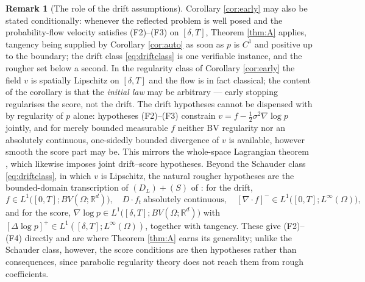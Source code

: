 \documentclass[11pt]{amsart}
\theoremstyle{definition}
\newtheorem{remark}[theorem]{Remark}
\newcommand{\dive}{\nabla\!\cdot}
\newcommand{\R}{\mathbb{R}}
\begin{document}
\begin{remark}[The role of the drift assumptions]
Corollary \ref{cor:early} may also be stated conditionally: whenever the
reflected problem is well posed and the probability-flow velocity
satisfies \textup{(F2)--(F3)} on $[\delta,T]$, Theorem \ref{thm:A}
applies, tangency being supplied by Corollary \ref{cor:auto} as soon
as $p$ is $C^1$ and positive up to the boundary; the drift class
\eqref{eq:driftclass} is one verifiable instance, and the rougher
set below a second. In the regularity class of Corollary
\ref{cor:early} the field $v$ is
spatially Lipschitz on $[\delta,T]$ and the flow is in fact
classical; the content of the corollary is that the \emph{initial
law} may be arbitrary --- early stopping regularises the score, not
the drift. The drift hypotheses cannot be dispensed with by
regularity of $p$ alone: hypotheses \textup{(F2)--(F3)} constrain
$v=f-\tfrac12\sigma^2\nabla\log p$ jointly, and for merely bounded
measurable $f$ neither BV regularity nor an absolutely continuous,
one-sidedly bounded divergence of $v$ is available, however smooth
the score part may be. This mirrors the whole-space Lagrangian
theorem \cite[Theorem~4.5]{pfode}, which likewise imposes joint
drift--score hypotheses. Beyond the Schauder class
\eqref{eq:driftclass}, in which $v$ is Lipschitz, the natural
rougher hypotheses are the bounded-domain transcription of
$(D_L)+(S)$ of \cite{pfode}: for the drift,
\[
f\in L^1\big([0,T];BV(\Omega;\R^d)\big),
\quad
D\!\cdot f_t\ \text{absolutely continuous},
\quad
[\dive f]^-\in L^1\big([0,T];L^\infty(\Omega)\big),
\]
and for the score, $\nabla\log p\in
L^1\big([\delta,T];BV(\Omega;\R^d)\big)$ with
$[\Delta\log p]^+\in L^1([\delta,T];L^\infty(\Omega))$, together
with tangency. These give \textup{(F2)--(F4)} directly and are
where Theorem \ref{thm:A} earns its generality; unlike the Schauder
class, however, the score conditions are then hypotheses rather than
consequences, since parabolic regularity theory does not reach them
from rough coefficients.
\end{remark}
\end{document}
